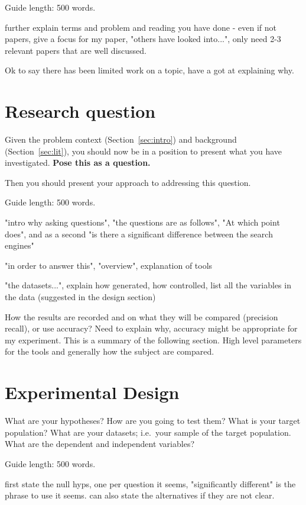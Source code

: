 \documentclass{csfourzero}
\begin{document}
Guide length: 500 words.

further explain terms and problem and reading you have done - even if not papers, give a focus for my paper, "others have looked into...", only need 2-3 relevant papers that are well discussed.

Ok to say there has been limited work on a topic, have a got at explaining why.

\section{Research question}
\label{sec:rq}

Given the problem context (Section~\ref{sec:intro}) and background
(Section~\ref{sec:lit}), you should now be in a position to present
what you have investigated. \textbf{Pose this as a question.}

Then you should present your approach to addressing this
question.

Guide length: 500 words.

"intro why asking questions", "the questions are as follows", "At which point does", and as a second "is there a significant difference between the search engines"

"in order to answer this", "overview", explanation of tools

"the datasets...", explain how generated, how controlled, list all the variables in the data (suggested in the design section)

How the results are recorded and on what they will be compared (precision recall), or use accuracy? Need to explain why, accuracy might be appropriate for my experiment. This is a summary of the following section. High level parameters for the tools and generally how the subject are compared.

\section{Experimental Design}
\label{sec:exp}

What are your hypotheses? How are you going to test them? What is your
target population? What are your datasets; i.e.\ your sample of the
target population. What are the dependent and independent variables?

Guide length: 500 words.

first state the null hyps, one per question it seems, "significantly different" is the phrase to use it seems. can also state the alternatives if they are not clear.
\end{document}
